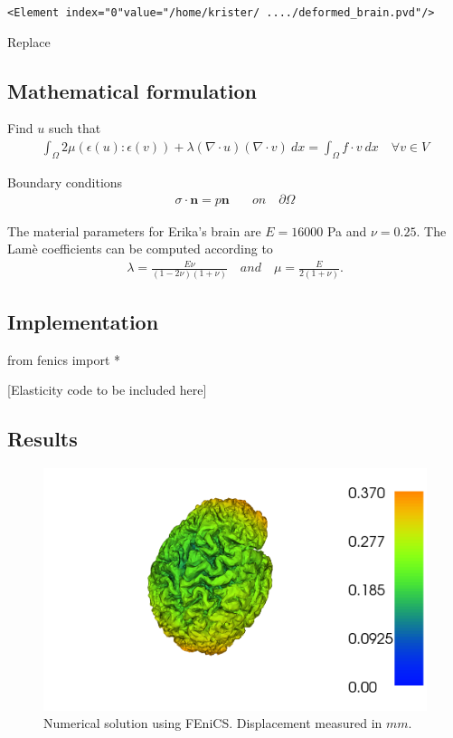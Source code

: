 \documentclass[epsfig,11pt]{article}
\begin{document}
\texttt{<Element index="0"value="/home/krister/ ..../deformed\_brain.pvd"/>}

Replace 


\subsection{Mathematical formulation}

Find $u$ such that 
\begin{align*}
  \int_\Omega  2\mu (\epsilon(u) : \epsilon(v))  +\lambda (\nabla \cdot u) (\nabla \cdot v) \: dx = \int_\Omega f \cdot v \: dx \quad \forall v \in V
\end{align*} 

Boundary conditions
\begin{align*}
\sigma \cdot \mathbf{n} = p\mathbf{n} \quad &on \quad \partial \Omega
\end{align*}

The material parameters for Erika's brain are $E = 16000 $ Pa and $\nu = 0.25$. The Lamè coefficients can be computed according to 
\begin{align*}
\lambda = \frac{E \nu}{(1-2\nu)(1+\nu)} \quad and \quad \mu = \frac{E}{2(1+\nu)}.
\end{align*}

\subsection{Implementation}

\begin{python}
from fenics import *

[Elasticity code to be included here]

\end{python}

\subsection{Results}

 \begin{figure}[h!] 
\begin{center}
  \includegraphics[scale=0.4]{brain.png}
  \end{center}
  \caption{Numerical solution using FEniCS. Displacement measured in $mm$.}
\end{figure}



\end{document}
